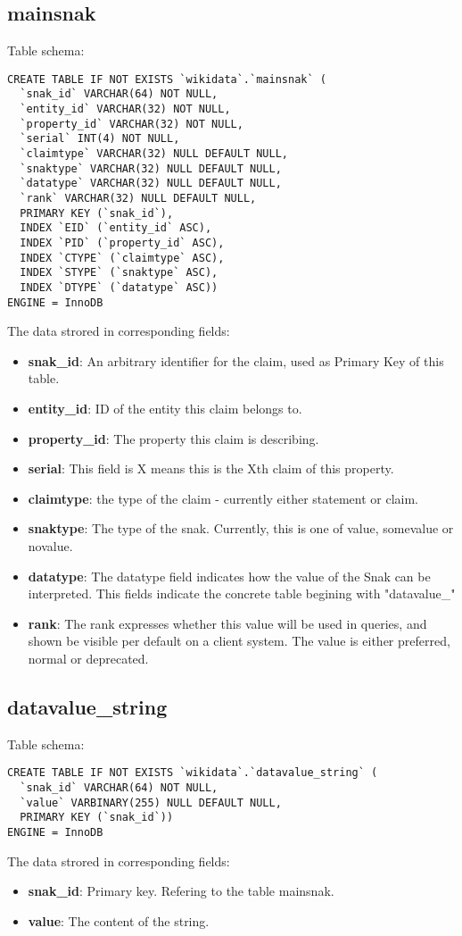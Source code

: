 \documentclass[12pt]{article}
\begin{document}
\subsection{mainsnak}
\lstset{language=SQL}
Table schema:
\begin{lstlisting}
CREATE TABLE IF NOT EXISTS `wikidata`.`mainsnak` (
  `snak_id` VARCHAR(64) NOT NULL,
  `entity_id` VARCHAR(32) NOT NULL,
  `property_id` VARCHAR(32) NOT NULL,
  `serial` INT(4) NOT NULL,
  `claimtype` VARCHAR(32) NULL DEFAULT NULL,
  `snaktype` VARCHAR(32) NULL DEFAULT NULL,
  `datatype` VARCHAR(32) NULL DEFAULT NULL,
  `rank` VARCHAR(32) NULL DEFAULT NULL,
  PRIMARY KEY (`snak_id`),
  INDEX `EID` (`entity_id` ASC),
  INDEX `PID` (`property_id` ASC),
  INDEX `CTYPE` (`claimtype` ASC),
  INDEX `STYPE` (`snaktype` ASC),
  INDEX `DTYPE` (`datatype` ASC))
ENGINE = InnoDB
\end{lstlisting}
The data strored in corresponding fields:
\begin{itemize}
\item \textbf{snak\_id}: An arbitrary identifier for the claim, used as Primary Key of this table.
\item \textbf{entity\_id}: ID of the entity this claim belongs to.
\item \textbf{property\_id}: The property this claim is describing.
\item \textbf{serial}: This field is X means this is the Xth claim of this property.
\item \textbf{claimtype}: the type of the claim - currently either statement or claim.
\item \textbf{snaktype}: The type of the snak. Currently, this is one of value, somevalue or novalue.
\item \textbf{datatype}: The datatype field indicates how the value of the Snak can be interpreted. This fields indicate the concrete table begining with "datavalue\_"
\item \textbf{rank}: The rank expresses whether this value will be used in queries, and shown be visible per default on a client system. The value is either preferred, normal or deprecated.
\end{itemize}
\subsection{datavalue\_string}
\lstset{language=SQL}
Table schema:
\begin{lstlisting}
CREATE TABLE IF NOT EXISTS `wikidata`.`datavalue_string` (
  `snak_id` VARCHAR(64) NOT NULL,
  `value` VARBINARY(255) NULL DEFAULT NULL,
  PRIMARY KEY (`snak_id`))
ENGINE = InnoDB
\end{lstlisting}
The data strored in corresponding fields:
\begin{itemize}
\item \textbf{snak\_id}: Primary key. Refering to the table mainsnak.
\item \textbf{value}: The content of the string.
\end{itemize}
\end{document}
